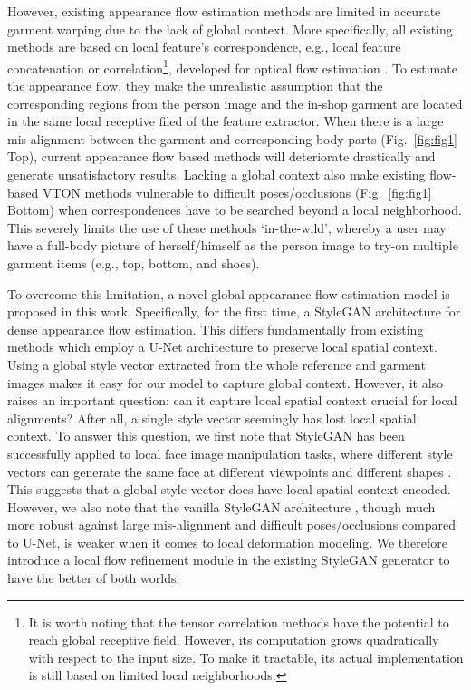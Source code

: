 \documentclass[10pt,twocolumn,letterpaper]{article}
\begin{document}
However, existing appearance flow estimation methods are limited in accurate garment warping due to the lack of global context. More specifically, all existing methods are based on local feature's correspondence, e.g., local feature concatenation or correlation\footnote{It is worth noting that the tensor correlation methods \cite{ge2021parser,dosovitskiy2015flownet, ilg2017flownet} have the potential to reach global receptive field. However, its computation grows quadratically with respect to the input size. To make it tractable, its actual implementation is still based on limited local neighborhoods.}, developed for optical flow estimation \cite{dosovitskiy2015flownet, ilg2017flownet}. To estimate the appearance flow, they make the unrealistic assumption that the corresponding regions from the person image and the in-shop garment are located in the same local receptive filed of the feature extractor. When there is a large mis-alignment between the garment and corresponding body parts (Fig.~\ref{fig:fig1} Top), current appearance flow based methods will deteriorate drastically and generate unsatisfactory results. Lacking a global context also make existing  flow-based VTON methods vulnerable to difficult poses/occlusions (Fig.~\ref{fig:fig1} Bottom) when correspondences have to be searched beyond a local neighborhood. This severely limits the use of these methods `in-the-wild', whereby a user may have a full-body picture of herself/himself as the person image to try-on multiple garment items (e.g., top, bottom, and shoes).  



 To overcome this limitation, a novel global appearance flow estimation model is proposed in this work. Specifically, for the first time,  a StyleGAN \cite{karras2019style,karras2020analyzing} architecture for dense appearance flow estimation. This differs fundamentally from existing methods \cite{ge2021parser,han2019clothflow, dosovitskiy2015flownet, ilg2017flownet} which employ a U-Net \cite{ronneberger2015u} architecture to preserve local spatial context. Using a global style vector extracted from the whole reference and garment images makes  it easy for our model to capture global context. However, it also raises an important question: can it capture local spatial context crucial for local alignments? After all, a single style vector seemingly has lost local spatial context. To answer this question, we first  note that StyleGAN has been successfully applied to local face image manipulation tasks, where different style vectors can generate the same face at different viewpoints \cite{shen2021closed} and different shapes \cite{or2020lifespan,he2021disentangled}. This suggests that a global style vector does have local spatial context encoded. However, we also note that the vanilla StyleGAN architecture \cite{karras2019style, karras2020analyzing}, though much more robust against large mis-alignment and difficult poses/occlusions compared to U-Net, is weaker when it comes to local deformation modeling. We therefore introduce a local flow refinement module in the existing StyleGAN generator to have the better of both worlds.  
\end{document}
